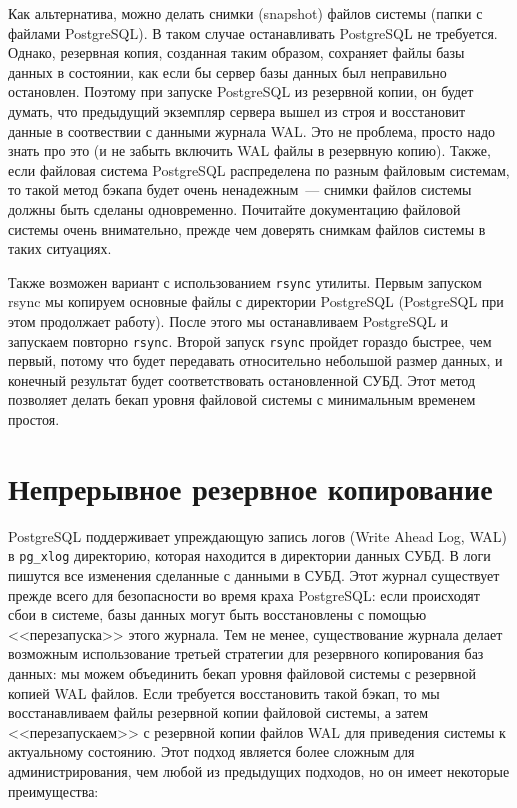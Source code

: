 Как альтернатива, можно делать снимки (snapshot) файлов системы (папки с файлами PostgreSQL). В таком случае останавливать PostgreSQL не требуется. Однако, резервная копия, созданная таким образом, сохраняет файлы базы данных в состоянии, как если бы сервер базы данных был неправильно остановлен. Поэтому при запуске PostgreSQL из резервной копии, он будет думать, что предыдущий экземпляр сервера вышел из строя и восстановит данные в соотвествии с данными журнала WAL. Это не проблема, просто надо знать про это (и не забыть включить WAL файлы в резервную копию). Также, если файловая система PostgreSQL распределена по разным файловым системам, то такой метод бэкапа будет очень ненадежным~--- снимки файлов системы должны быть сделаны одновременно. Почитайте документацию файловой системы очень внимательно, прежде чем доверять снимкам файлов системы в таких ситуациях.

Также возможен вариант с использованием \lstinline!rsync! утилиты. Первым запуском rsync мы копируем основные файлы с директории PostgreSQL (PostgreSQL при этом продолжает работу). После этого мы останавливаем PostgreSQL и запускаем повторно \lstinline!rsync!. Второй запуск \lstinline!rsync! пройдет гораздо быстрее, чем первый, потому что будет передавать относительно небольшой размер данных, и конечный результат будет соответствовать остановленной СУБД. Этот метод позволяет делать бекап уровня файловой системы с минимальным временем простоя.


\section{Непрерывное резервное копирование}

PostgreSQL поддерживает упреждающую запись логов (Write Ahead Log, WAL) в \lstinline!pg_xlog! директорию, которая находится в директории данных СУБД. В логи пишутся все изменения сделанные с данными в СУБД. Этот журнал существует прежде всего для безопасности во время краха PostgreSQL: если происходят сбои в системе, базы данных могут быть восстановлены с помощью <<перезапуска>> этого журнала. Тем не менее, существование журнала делает возможным использование третьей стратегии для резервного копирования баз данных: мы можем объединить бекап уровня файловой системы с резервной копией WAL файлов. Если требуется восстановить такой бэкап, то мы восстанавливаем файлы резервной копии файловой системы, а затем <<перезапускаем>> с резервной копии файлов WAL для приведения системы к актуальному состоянию. Этот подход является более сложным для администрирования, чем любой из предыдущих подходов, но он имеет некоторые преимущества:

